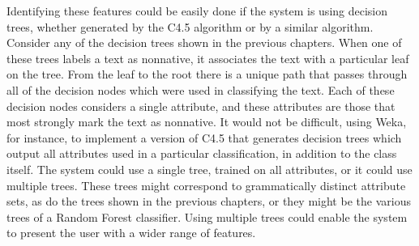 \documentclass[main.tex]{subfiles}
\begin{document}
Identifying these features could be easily done if the system is using decision trees, whether generated by the C4.5 algorithm or by a similar algorithm. Consider any of the decision trees shown in the previous chapters. When one of these trees labels a text as nonnative, it associates the text with a particular leaf on the tree. From the leaf to the root there is a unique path that passes through all of the decision nodes which were used in classifying the text. Each of these decision nodes considers a single attribute, and these attributes are those that most strongly mark the text as nonnative. It would not be difficult, using Weka, for instance, to implement a version of C4.5 that generates decision trees which output all attributes used in a particular classification, in addition to the class itself. The system could use a single tree, trained on all attributes, or it could use multiple trees. These trees might correspond to grammatically distinct attribute sets, as do the trees shown in the previous chapters, or they might be the various trees of a Random Forest classifier. Using multiple trees could enable the system to present the user with a wider range of features.
\end{document}
